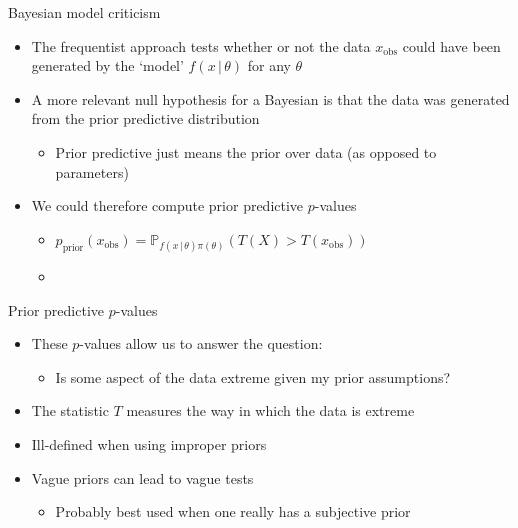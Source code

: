 \begin{frame}{Bayesian model criticism}
  \begin{itemize}
    \item The frequentist approach tests whether or not the data $x_{\textrm{obs}}$ could have been generated by the `model' $f(x\,|\,\theta)$ for any $\theta$
    \vspace{\baselineskip}
    \pause
    \item A more relevant null hypothesis for a Bayesian is that the data was generated from the prior predictive distribution
    \begin{itemize}
      \item Prior predictive just means the prior over data (as opposed to parameters)
    \end{itemize}
    \vspace{\baselineskip}
    \pause
    \item We could therefore compute prior predictive $p$-values
    \begin{itemize}
      \item $p_{\textrm{prior}}(x_{\textrm{obs}}) = \mathbb{P}_{f(x\,|\,\theta)\pi(\theta)}(T(X) > T(x_{\textrm{obs}}))$
      \item \cite{Box1980-ud}
    \end{itemize}
  \end{itemize}
\end{frame}

\begin{frame}{Prior predictive $p$-values}
  \begin{itemize}
    \item These $p$-values allow us to answer the question:
    \begin{itemize}
      \item Is some aspect of the data extreme given my prior assumptions?
    \end{itemize}
    \vspace{\baselineskip}
    \pause
    \item The statistic $T$ measures the way in which the data is extreme
    \vspace{\baselineskip}
    \pause
    \item Ill-defined when using improper priors 
    \vspace{\baselineskip}
    \pause
    \item Vague priors can lead to vague tests
    \begin{itemize}
      \item Probably best used when one really has a subjective prior
    \end{itemize}
  \end{itemize}
\end{frame}


